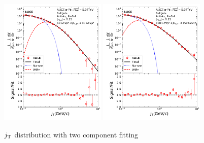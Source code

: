 \begin{figure}[htb]
\begin{center}
\includegraphics[width=0.45\textwidth]{figures/results/JtSignalFinalFitJetPt5.pdf}
\includegraphics[width=0.45\textwidth]{figures/results/JtSignalFinalFitJetPt7.pdf}
\caption{$j_{\rm T}$ distribution with two component fitting}

\label{fig:fits}
\end{center}
\end{figure}


